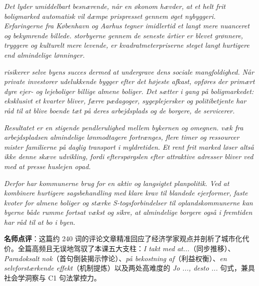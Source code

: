 \begin{answerbox}
\textit{Det lyder umiddelbart besnærende, når en økonom hævder, at et helt frit boligmarked automatisk vil dæmpe prispresset gennem øget nybyggeri. Erfaringerne fra København og Aarhus tegner imidlertid et langt mere nuanceret og bekymrende billede.  storbyerne gennem de seneste årtier er blevet grønnere, tryggere og kulturelt mere levende, er kvadratmeterpriserne steget langt hurtigere end almindelige lønninger.}

\textit{ risikerer selve byens succes dermed at undergrave dens sociale mangfoldighed. Når private investorer udelukkende bygger efter det højeste afkast, opføres der primært dyre ejer- og lejeboliger  billige almene boliger. Det sætter  i gang på boligmarkedet:  eksklusivt et kvarter bliver,  færre pædagoger, sygeplejersker og politibetjente har råd til at blive boende tæt på deres arbejdsplads og de borgere, de servicerer.}

\textit{Resultatet er en stigende pendlerulighed mellem bykernen og omegnen.  væk fra arbejdspladsen almindelige lønmodtagere fortrænges,  flere timer og ressourcer mister familierne på daglig transport i myldretiden. Et rent frit marked løser altså ikke denne skæve udvikling, fordi efterspørgslen efter attraktive adresser bliver ved med at presse huslejen opad.}

\textit{Derfor har kommunerne brug for en aktiv og langsigtet planpolitik. Ved at kombinere hurtigere sagsbehandling med klare krav til blandede ejerformer, faste kvoter for almene boliger og stærke S-togsforbindelser til oplandskommunerne kan byerne både rumme fortsat vækst og sikre, at almindelige borgere også i fremtiden har råd til at bo i byen.}

\small\textbf{名师点评}：这篇约 240 词的评论文章精准回应了经济学家观点并剖析了城市化代价。全篇高频且无误地驾驭了本课五大支柱：\textit{I takt med at...}（同步推移）、\textit{Paradoksalt nok}（首句倒装揭示悖论）、\textit{på bekostning af}（利益权衡）、\textit{en selvforstærkende effekt}（机制提炼）以及两处高难度的 \textit{Jo ..., desto ...} 句式，兼具社会学洞察与 C1 句法掌控力。
\end{answerbox}
